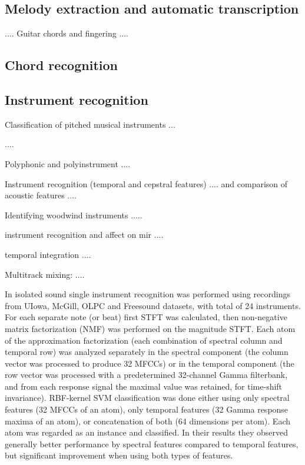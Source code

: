 \documentclass[journal]{IEEEtran}
\begin{document}
\subsection{Melody extraction and automatic transcription}

\cite{benetos2013automatic,ohanlon2013automatic,peeters2006music}....
Guitar chords and fingering \cite{barbancho2012automatic}....
\subsection{Chord recognition}
\subsection{Instrument recognition}
Classification of pitched musical instruments \cite{herrera2006automatic}...

\cite{martin1998musical,yu2014sparse}....

Polyphonic and polyinstrument \cite{hamel2009automatic}....

Instrument recognition (temporal and cepstral features) \cite{eronen2000musical}.... and comparison of acoustic features \cite{eronen2001comparison}....

Identifying woodwind instruments \cite{brown2001feature}.....

instrument recognition and affect on mir \cite{kitahara2007computational}....

temporal integration \cite{Joder:09}....

Multitrack mixing: \cite{scottinstrument,scott2011automatic}....

In \cite{tjoa2010musical} isolated sound single instrument recognition was performed using recordings from UIowa, McGill, OLPC and Freesound datasets, with total of 24 instruments.
For each separate note (or beat) first STFT was calculated, then non-negative matrix factorization (NMF) was performed on the magnitude STFT. Each atom of the approximation factorization (each combination of spectral column and temporal row) was analyzed separately in the spectral component (the column vector was processed to produce 32 MFCCs) or in the temporal component (the row vector was processed with a predetermined 32-channel Gamma filterbank, and from each response signal the maximal value was retained, for time-shift invariance). RBF-kernel SVM classification was done either using only spectral features (32 MFCCs of an atom), only temporal features (32 Gamma response maxima of an atom), or concatenation of both (64 dimensions per atom). Each atom was regarded as an instance and classified.
In their results they observed generally better performance by spectral features compared to temporal features, but significant improvement when using both types of features.
\end{document}
